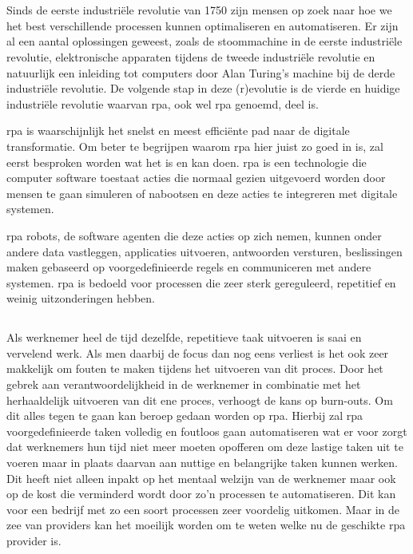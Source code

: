 
\chapter{}
\label{ch:inleiding}
Sinds de eerste industriële revolutie van 1750 zijn mensen op zoek naar hoe we het best verschillende processen kunnen optimaliseren en automatiseren. Er zijn al een aantal oplossingen geweest, zoals de stoommachine in de eerste industriële revolutie, elektronische apparaten tijdens de tweede industriële revolutie en natuurlijk een inleiding tot computers door Alan Turing's machine bij de derde industriële revolutie. De volgende stap in deze (r)evolutie is de vierde en huidige industriële revolutie waarvan \acrlong{rpa}, ook wel \acrshort{rpa} genoemd, deel is. \autocite{indusRev}

\acrshort{rpa} is waarschijnlijk het snelst en meest efficiënte pad naar de digitale transformatie. Om beter te begrijpen waarom \acrshort{rpa} hier juist zo goed in is, zal eerst besproken worden wat het is en kan doen. \acrshort{rpa} is een technologie die computer software toestaat acties die normaal gezien uitgevoerd worden door mensen te gaan simuleren of nabootsen en deze acties te integreren met digitale systemen.

\acrshort{rpa} robots, de software agenten die deze acties op zich nemen, kunnen onder andere data vastleggen, applicaties uitvoeren, antwoorden versturen, beslissingen maken gebaseerd op voorgedefinieerde regels en communiceren met andere systemen. \acrshort{rpa} is bedoeld voor processen die zeer sterk gereguleerd, repetitief en weinig uitzonderingen hebben.

\section{}
\label{sec:probleemstelling}
Als werknemer heel de tijd dezelfde, repetitieve taak uitvoeren is saai en vervelend werk. Als men daarbij de focus dan nog eens verliest is het ook zeer makkelijk om fouten te maken tijdens het uitvoeren van dit proces. Door het gebrek aan verantwoordelijkheid in de werknemer in combinatie met het herhaaldelijk uitvoeren van dit ene proces, verhoogt de kans op burn-outs. Om dit alles tegen te gaan kan beroep gedaan worden op \acrlong{rpa}. Hierbij zal \acrshort{rpa} voorgedefinieerde taken volledig en foutloos gaan automatiseren wat er voor zorgt dat werknemers hun tijd niet meer moeten opofferen om deze lastige taken uit te voeren maar in plaats daarvan aan nuttige en belangrijke taken kunnen werken. Dit heeft niet alleen inpakt op het mentaal welzijn van de werknemer maar ook op de kost die verminderd wordt door zo'n processen te automatiseren. Dit kan voor een bedrijf met zo een soort processen zeer voordelig uitkomen. Maar in de zee van providers kan het moeilijk worden om te weten welke nu de geschikte \acrshort{rpa} provider is.

